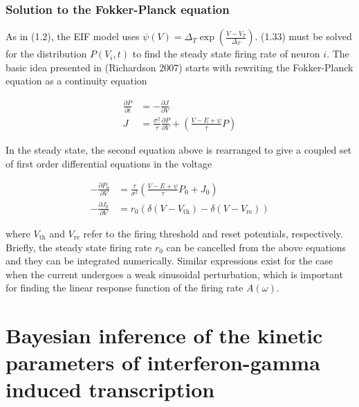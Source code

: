 \documentclass{ucetd}
\begin{document}
\subsection{Solution to the Fokker-Planck equation}

As in (1.2), the EIF model uses $\psi(V) = \Delta_{T}\exp\left(\frac{V-V_{T}}{\Delta_{T}}\right)$. (1.33) must be solved for the distribution $P(V_{i},t)$ to find the steady state firing rate of neuron $i$. The basic idea presented in (Richardson 2007) starts with rewriting the Fokker-Planck equation as a continuity equation

\begin{align*}
\frac{\partial P}{\partial t} &= -\frac{\partial J}{\partial V}\\
J &= \frac{\sigma^{2}}{\tau}\frac{\partial P}{\partial V} + \left(\frac{V-E+\psi}{\tau}P\right)
\end{align*}

In the steady state, the second equation above is rearranged to give a coupled set of first order differential equations in the voltage

\begin{align*}
-\frac{\partial P_{0}}{\partial V} &= \frac{\tau}{\sigma^{2}}\left(\frac{V-E+\psi}{\tau}P_{0} + J_{0}\right)\\
-\frac{\partial J_{0}}{\partial V} &= r_{0}\left(\delta(V-V_{\mathrm{th}}) - \delta(V-V_{\mathrm{re}})\right)
\end{align*}

where $V_{\mathrm{th}}$ and $V_{\mathrm{re}}$ refer to the firing threshold and reset potentials, respectively. Briefly, the steady state firing rate $r_{0}$ can be cancelled from the above equations and they can be integrated numerically. Similar expressions exist for the case when the current undergoes a weak sinusoidal perturbation, which is important for finding the linear response function of the firing rate $A(\omega)$. 




\chapter{Bayesian inference of the kinetic parameters of interferon-gamma induced transcription}
\end{document}
